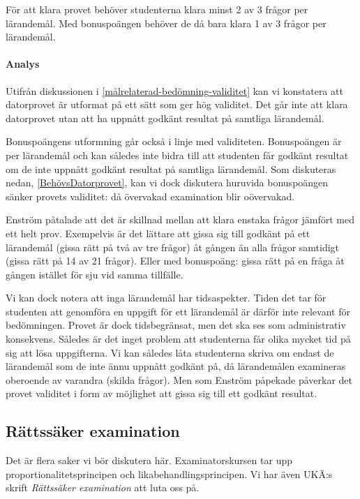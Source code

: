 För att klara provet behöver studenterna klara minst 2 av 3 frågor per 
lärandemål.
Med bonuspoängen behöver de då bara klara 1 av 3 frågor per lärandemål.

\paragraph{Analys}

Utifrån diskussionen i \cref{målrelaterad-bedömning-validitet} kan vi 
konstatera att datorprovet är utformat på ett sätt som ger hög validitet.
Det går inte att klara datorprovet utan att ha uppnått godkänt resultat på 
samtliga lärandemål.

Bonuspoängens utformning går också i linje med validiteten.
Bonuspoängen är per lärandemål och kan således inte bidra till att studenten 
får godkänt resultat om de inte uppnått godkänt resultat på samtliga 
lärandemål.
Som diskuteras nedan, \cref{BehövsDatorprovet}, kan vi dock diskutera huruvida 
bonuspoängen sänker provets validitet:
då övervakad examination blir oövervakad.

Enström påtalade att det är skillnad mellan att klara enstaka frågor jämfört 
med ett helt prov.
Exempelvis är det lättare att gissa sig till godkänt på ett lärandemål (gissa 
rätt på två av tre frågor) åt gången än alla frågor samtidigt (gissa rätt på 14 
av 21 frågor).
Eller med bonuspoäng:
gissa rätt på en fråga åt gången istället för sju vid samma tillfälle.

Vi kan dock notera att inga lärandemål har tidsaspekter.
Tiden det tar för studenten att genomföra en uppgift för ett lärandemål är 
därför inte relevant för bedömningen.
Provet är dock tidsbegränsat, men det ska ses som administrativ konsekvens.
Således är det inget problem att studenterna får olika mycket tid på sig att 
lösa uppgifterna.
Vi kan således låta studenterna skriva om endast de lärandemål som de inte ännu 
uppnått godkänt på, då lärandemålen examineras oberoende av varandra (skilda 
frågor).
Men som Enström påpekade påverkar det provet validitet i form av möjlighet att 
gissa sig till ett godkänt resultat.


\subsection{Rättssäker examination}

Det är flera saker vi bör diskutera här.
Examinatorskursen tar upp proportionalitetsprincipen och 
likabehandlingsprincipen.
Vi har även UKÄ:s skrift \emph{Rättssäker examination} att luta oss på.

